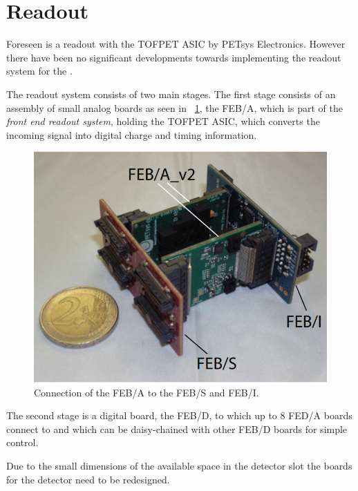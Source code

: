 \documentclass[../BTOF_summary.tex]{subfiles}
\begin{document}
\section{Readout}

Foreseen is a readout with the TOFPET ASIC by PETsys Electronics.
However there have been no significant developments towards implementing the readout system for the \btofD .

The readout system consists of two main stages.
The first stage consists of an assembly of small analog boards as seen in \fig~\ref{fig:FEB_AIS}, the FEB/A, which is part of the \textit{front end readout system}, holding the TOFPET ASIC, which converts the incoming signal into digital charge and timing information.

\begin{figure}[htbp]
    \centering
    \includegraphics*[width=.8\textwidth]{fig/FEB_A_I_S.png}
    \caption{Connection of the FEB/A to the FEB/S and FEB/I.}
    \label{fig:FEB_AIS}
\end{figure}

The second stage is a digital board, the FEB/D, to which up to 8 FED/A boards connect to and which can be daisy-chained with other FEB/D boards for simple control.

Due to the small dimensions of the available space in the detector slot the boards for the detector need to be redesigned.
\end{document}
